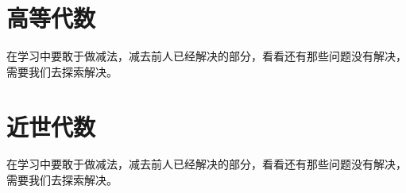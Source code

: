 \chapter{\maoti 高等代数}
\vspace{13.4pt}
\begin{center}
	\textcolor[RGB]{255, 0, 0}{\faHeart}在学习中要敢于做减法，减去前人已经解决的部分，看看还有那些问题没有解决，需要我们去探索解决。\textcolor[RGB]{255, 0, 0}{\faHeart}
\end{center}


\newpage
{}
\chapter{\maoti 近世代数}
\vspace{19.4pt}
\begin{center}
	\textcolor[RGB]{255, 0, 0}{\faHeart}在学习中要敢于做减法，减去前人已经解决的部分，看看还有那些问题没有解决，需要我们去探索解决。\textcolor[RGB]{255, 0, 0}{\faHeart}
\end{center}